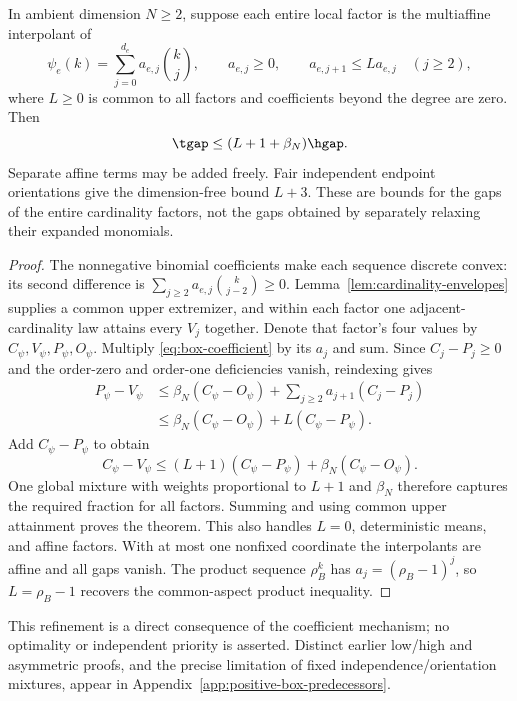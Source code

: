 \begin{theorem}
\label{thm:coefficient-regularity}
In ambient dimension $N\ge2$, suppose each entire local factor is the
multiaffine interpolant of
\[
 \psi_e(k)=\sum_{j=0}^{d_e}a_{e,j}\binom kj,\qquad a_{e,j}\ge0,
 \qquad a_{e,j+1}\le L a_{e,j}\quad(j\ge2),
\]
where $L\ge0$ is common to all factors and coefficients beyond the
degree are zero. Then
\[
 \tgap\le(L+1+\beta_N)\hgap.
\]
Separate affine terms may be added freely. Fair independent endpoint
orientations give the dimension-free bound $L+3$. These are bounds
for the gaps of the entire cardinality factors, not the gaps obtained
by separately relaxing their expanded monomials.
\end{theorem}
\begin{proof}
The nonnegative binomial coefficients make each sequence discrete convex:
its second difference is $\sum_{j\ge2}a_{e,j}\binom{k}{j-2}\ge0$.
Lemma~\ref{lem:cardinality-envelopes} supplies a common upper extremizer,
and within each factor one adjacent-cardinality law attains every
$V_j$ together. Denote that factor's four values by $C_\psi,V_\psi,
P_\psi,O_\psi$. Multiply \eqref{eq:box-coefficient} by its $a_j$ and
sum. Since $C_j-P_j\ge0$ and the order-zero and order-one deficiencies
vanish, reindexing gives
\[
 \begin{split}
 P_\psi-V_\psi
 &\le\beta_N(C_\psi-O_\psi)
          +\sum_{j\ge2}a_{j+1}(C_j-P_j)\\
 &\le\beta_N(C_\psi-O_\psi)+L(C_\psi-P_\psi).
 \end{split}
\]
Add $C_\psi-P_\psi$ to obtain
\[
 C_\psi-V_\psi\le(L+1)(C_\psi-P_\psi)+\beta_N(C_\psi-O_\psi).
\]
One global mixture with weights proportional to $L+1$ and $\beta_N$
therefore captures the required fraction for all factors. Summing
and using common upper attainment proves the theorem. This also
handles $L=0$, deterministic means, and affine factors. With at most
one nonfixed coordinate the interpolants are affine and all gaps vanish.
The product sequence $\rho_B^k$ has $a_j=(\rho_B-1)^j$, so
$L=\rho_B-1$ recovers the common-aspect product inequality.
\end{proof}
This refinement is a direct consequence of the coefficient mechanism;
no optimality or independent priority is asserted. Distinct earlier
low/high and asymmetric proofs, and the precise limitation of fixed
independence/orientation mixtures, appear in
Appendix~\ref{app:positive-box-predecessors}.

